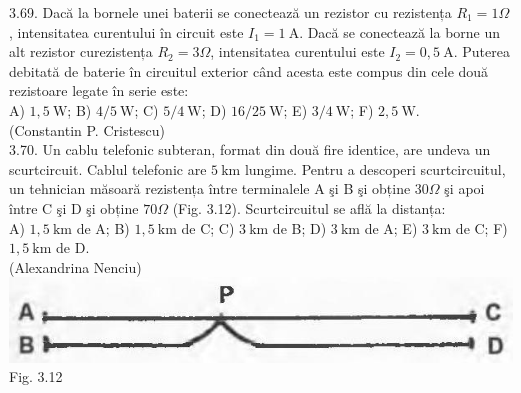 \documentclass[10pt]{article}
\begin{document}
3.69. Dacă la bornele unei baterii se conectează un rezistor cu rezistența $R_{1}=1 \Omega$, intensitatea curentului în circuit este $I_{1}=1 \mathrm{~A}$. Dacă se conectează la borne un alt rezistor curezistența $R_{2}=3 \Omega$, intensitatea curentului este $I_{2}=0,5 \mathrm{~A}$. Puterea debitată de baterie în circuitul exterior când acesta este compus din cele două rezistoare legate în serie este:\\ A) $1,5 \mathrm{~W}$; B) $4 / 5 \mathrm{~W}$; C) $5 / 4 \mathrm{~W}$; D) $16 / 25 \mathrm{~W}$; E) $3 / 4 \mathrm{~W}$; F) $2,5 \mathrm{~W}$.\\ (Constantin P. Cristescu)\\

3.70. Un cablu telefonic subteran, format din două fire identice, are undeva un scurtcircuit. Cablul telefonic are $5 \mathrm{~km}$ lungime. Pentru a descoperi scurtcircuitul, un tehnician măsoară rezistența între terminalele A şi B şi obține $30 \Omega$ şi apoi între C şi D şi obține $70 \Omega$ (Fig. 3.12). Scurtcircuitul se află la distanța:\\ A) $1,5 \mathrm{~km}$ de A; B) $1,5 \mathrm{~km}$ de C; C) $3 \mathrm{~km}$ de B; D) $3 \mathrm{~km}$ de A; E) $3 \mathrm{~km}$ de C; F) $1,5 \mathrm{~km}$ de D.\\ (Alexandrina Nenciu)\\ \includegraphics[max width=\textwidth, center]{2025_07_01_5b3ff9fa0d508c8e9f17g-159} Fig. 3.12\\
\end{document}

